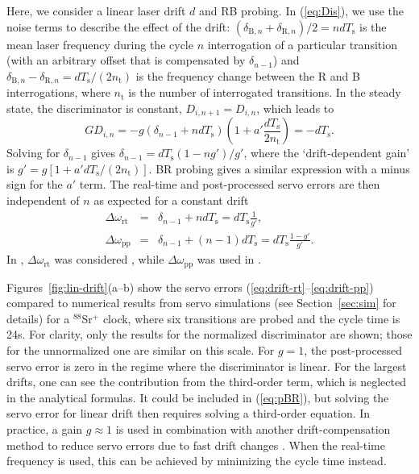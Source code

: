 \documentclass[10pt,a4paper]{iopart}
\newcommand{\eqref}[1]{(\ref{#1})}
\begin{document}
\setcounter{section}{1}

Here, we consider a linear laser drift $d$ and RB probing.
In \eqref{eq:Dis}, we use the noise terms to describe the effect of the drift: $(\delta_{\mathrm{B},n} + \delta_{\mathrm{R},n})/2 = n d T_\mathrm{s}$ is the mean laser frequency during the cycle $n$ interrogation of a particular transition (with an arbitrary offset that is compensated by $\delta_{n-1}$) and $\delta_{\mathrm{B},n} - \delta_{\mathrm{R},n} = d T_\mathrm{s}/(2 n_\mathrm{t})$ is the frequency change between the R and B interrogations, where $n_\mathrm{t}$ is the number of interrogated transitions.
In the steady state, the discriminator is constant, $D_{i,n+1}= D_{i,n}$, which leads to
\begin{equation}
G D_{i,n} = - g (\delta_{n-1} + n d T_\mathrm{s})\left(1+ a' \frac{d T_\mathrm{s}}{2 n_\mathrm{t}} \right) = -d T_\mathrm{s}.
\end{equation}
Solving for $\delta_{n-1}$ gives $\delta_{n-1} = d T_\mathrm{s} ( 1 - ng')/g'$, where the `drift-dependent gain' is $g' = g [ 1 + a' d T_\mathrm{s}/(2 n_\mathrm{t})]$. BR probing gives a similar expression with a minus sign for the $a'$ term.
The real-time and post-processed servo errors are then independent of $n$ as expected for a constant drift
\begin{eqnarray}
\Delta\omega_{\mathrm{rt}} &=& \delta_{n-1} + n dT_\mathrm{s} = d T_\mathrm{s} \frac{1}{g'} \label{eq:drift-rt}, \\
\Delta\omega_{\mathrm{pp}} &=& \delta_{n-1} + (n-1) dT_\mathrm{s} = d T_\mathrm{s} \frac{1 - g'}{g'} \label{eq:drift-pp}.
\end{eqnarray}
In \cite{Yuan2021a}, $\Delta\omega_{\mathrm{rt}}$ was considered , while $\Delta\omega_{\mathrm{pp}}$ was used in \cite{Dube2018a}.

Figures~\ref{fig:lin-drift}(a--b) show the servo errors (\ref{eq:drift-rt}--\ref{eq:drift-pp}) compared to numerical results from servo simulations (see Section~\ref{sec:sim} for details) for a $^{88}$Sr$^+$ clock, where six transitions are probed and the cycle time is 24\;s. For clarity, only the results for the normalized discriminator are shown; those for the unnormalized one are similar on this scale. For $g=1$, the post-processed servo error is zero in the regime where the discriminator is linear. For the largest drifts, one can see the contribution from the third-order term, which is neglected in the analytical formulas. It could be included in \eqref{eq:pBR}, but solving the servo error for linear drift then requires solving a third-order equation. In practice, a gain $g\approx 1$ is used in combination with another drift-compensation method to reduce servo errors due to fast drift changes \cite{Dube2017a,Dube2018a}. When the real-time frequency is used, this can be achieved by minimizing the cycle time instead.
\end{document}
